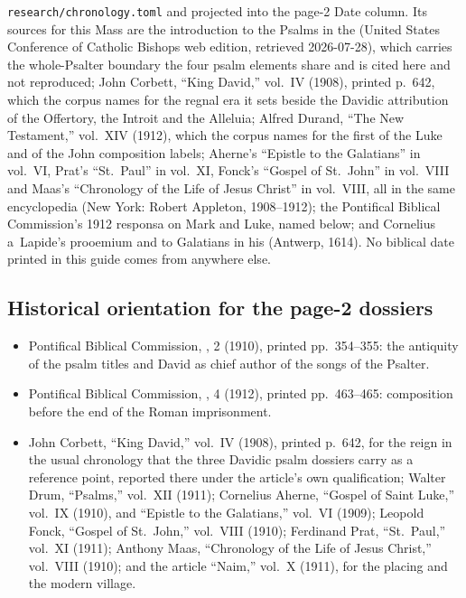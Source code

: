 \begin{itemize}
\texttt{research/chronology.toml} and projected into the page-2 Date column. Its
sources for this Mass are the introduction to the Psalms in the  (United States Conference of Catholic Bishops web
edition, retrieved 2026-07-28), which carries the whole-Psalter boundary the four
psalm elements share and is cited here and not reproduced; John Corbett, ``King
David,''  vol.~IV (1908), printed p.~642, which
the corpus names for the regnal era it sets beside the Davidic attribution of
the Offertory, the Introit and the Alleluia; Alfred Durand, ``The New
Testament,'' vol.~XIV (1912), which the corpus names for the first of the Luke
and of the John composition labels; Aherne's ``Epistle to the Galatians'' in
vol.~VI, Prat's ``St.\ Paul'' in vol.~XI, Fonck's ``Gospel of St.\ John'' in
vol.~VIII and Maas's ``Chronology of the Life of Jesus Christ'' in vol.~VIII,
all in the same encyclopedia (New York: Robert Appleton, 1908--1912); the Pontifical Biblical Commission's 1912 responsa
on Mark and Luke, named below; and Cornelius a~Lapide's prooemium and
 to Galatians in his  (Antwerp, 1614). No biblical date printed in this guide comes from
anywhere else.
\end{itemize}

\subsection*{Historical orientation for the page-2 dossiers}

\begin{itemize}
\item Pontifical Biblical Commission, ,  2 (1910), printed
pp.~354--355: the antiquity of the psalm titles and David as chief author of the
songs of the Psalter.
\item Pontifical Biblical Commission, ,  4 (1912), printed
pp.~463--465: composition before the end of the Roman imprisonment.
\item John Corbett, ``King David,''  vol.~IV
(1908), printed p.~642, for the reign in the usual chronology that the three
Davidic psalm dossiers carry as a reference point, reported there under the
article's own qualification; Walter Drum, ``Psalms,'' vol.~XII (1911);
Cornelius Aherne, ``Gospel of Saint Luke,'' vol.~IX (1910), and ``Epistle to the
Galatians,'' vol.~VI (1909); Leopold Fonck, ``Gospel of St.\ John,'' vol.~VIII
(1910); Ferdinand Prat, ``St.\ Paul,'' vol.~XI (1911); Anthony Maas, ``Chronology
of the Life of Jesus Christ,'' vol.~VIII (1910); and the article ``Naim,''
vol.~X (1911), for the  placing and the modern village.
\end{itemize}

